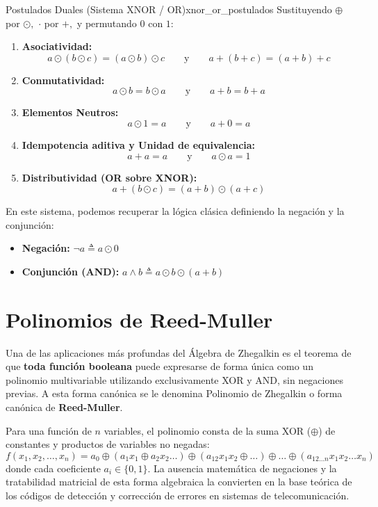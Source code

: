 \begin{teorema}{Postulados Duales (Sistema XNOR / OR)}{xnor_or_postulados}
Sustituyendo $\oplus$ por $\odot,$ $\cdot$ por $+,$ y permutando $0$ con $1:$
\begin{enumerate}
    \item \textbf{Asociatividad:} 
    \[ a \odot (b \odot c) = (a \odot b) \odot c \qquad \text{y} \qquad a + (b + c) = (a + b) + c \]
    \item \textbf{Conmutatividad:} 
    \[ a \odot b = b \odot a \qquad \text{y} \qquad a + b = b + a \]
    \item \textbf{Elementos Neutros:} 
    \[ a \odot 1 = a \qquad \text{y} \qquad a + 0 = a \]
    \item \textbf{Idempotencia aditiva y Unidad de equivalencia:} 
    \[ a + a = a \qquad \text{y} \qquad a \odot a = 1 \]
    \item \textbf{Distributividad (OR sobre XNOR):} 
    \[ a + (b \odot c) = (a + b) \odot (a + c) \]
\end{enumerate}
\end{teorema}

En este sistema, podemos recuperar la lógica clásica definiendo la negación y la conjunción:
\begin{itemize}
    \item \textbf{Negación:} $\neg a \triangleq a \odot 0$
    \item \textbf{Conjunción (AND):} $a \wedge b \triangleq a \odot b \odot (a + b)$
\end{itemize}

\section{Polinomios de Reed-Muller}

Una de las aplicaciones más profundas del Álgebra de Zhegalkin es el teorema de que \textbf{toda función booleana} puede expresarse de forma única como un polinomio multivariable utilizando exclusivamente XOR y AND, sin negaciones previas. A esta forma canónica se le denomina Polinomio de Zhegalkin o forma canónica de \textbf{Reed-Muller}.

Para una función de $n$ variables, el polinomio consta de la suma XOR ($\oplus$) de constantes y productos de variables no negadas:
\[ f(x_1, x_2, \dots, x_n) = a_0 \oplus (a_1 x_1 \oplus a_2 x_2 \dots) \oplus (a_{12} x_1 x_2 \oplus \dots) \oplus \dots \oplus (a_{12\dots n} x_1 x_2 \dots x_n) \]
donde cada coeficiente $a_i \in \{0, 1\}.$ La ausencia matemática de negaciones y la tratabilidad matricial de esta forma algebraica la convierten en la base teórica de los códigos de detección y corrección de errores en sistemas de telecomunicación.

